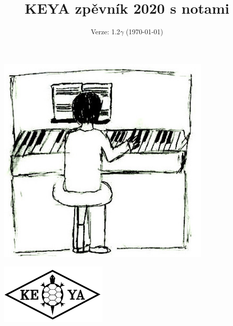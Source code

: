 \documentclass[twoside,12pt,a5paper]{article}
\title{KEYA zpěvník 2020 s notami}
\date{Verze: 1.2$\gamma$ (\today)}
\begin{document}
\maketitle
\begin{center}


\includegraphics[width=0.8\textwidth]{pict/noty} 


\end{center}


\begin{center}


\includegraphics[width=0.4\textwidth]{pict/logo}


\end{center}
\cleardoublepage
\begin{multicols}{2}
\begin{footnotesize}
\tableofcontents{}
\end{footnotesize}
\end{multicols}
\clearpage

\clearpage
\end{document}
